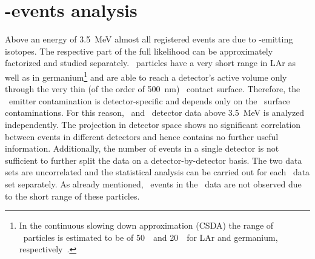 \section{\texorpdfstring{\a-events analysis}{alpha-events analysis}}%
\label{sec:bkg:raw:ph2:amodel}

Above an energy of 3.5~MeV almost all registered events are due to \a-emitting isotopes.
The respective part of the full likelihood can be approximately factorized and studied
separately. \a\ particles have a very short range in LAr as well as in
germanium\footnote{%
  In the continuous slowing down approximation (CSDA) the range of \a\ particles is
  estimated to be of 50~\mum\ and 20~\mum\ for LAr and germanium,
  respectively~\cite{Berger2017}.
} and are able to reach a detector's active volume only
through the very thin (of the order of 500~nm) \pplus\ contact surface. Therefore, the \a\
emitter contamination is detector-specific and depends only on the \pplus\ surface
contaminations. For this reason, \enrBEGeII\ and \enrCoaxII\ detector data above 3.5~MeV
is analyzed independently. The projection in detector space shows no significant correlation
between events in different detectors and hence contains no further useful information.
Additionally, the number of events in a single detector is not sufficient to further split
the data on a detector-by-detector basis. The two data sets are uncorrelated and the
statistical analysis can be carried out for each \Mone\ data set separately. As already
mentioned, \a\ events in the \Mtwo\ data are not observed due to the short range of these
particles.

